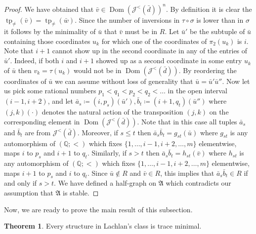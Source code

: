 \documentclass{amsart}
\theoremstyle{definition}
\newtheorem{theorem}{Theorem}[section]
\theoremstyle{remark}
\numberwithin{equation}{section}
\newcommand{\dom}{\operatorname{Dom}}
\newcommand{\typ}{\operatorname{tp}}
\newcommand\johnord[1]{\mathcal{J}^{<}(#1)}
\newcommand{\fa}{\mathfrak{A}}
\begin{document}
\begin{proof}
	We have obtained that $\bar{v}\in \dom(\johnord{\bar{d}})^n$. By definition it is clear the $\typ_{\neq}(\bar{v})=\typ_{\neq}(\bar{w})$. Since the number of inversions in $\tau\circ \sigma$ is lower than in $\sigma$ it follows by the minimality of $\bar{u}$ that $\bar{v}$ must be in $R$. Let $\bar{u}'$ be the subtuple of $\bar{u}$ containing those coordinates $u_k$ for which one of the coordinates of $\pi_2(u_k)$ is $i$. 
    Note that $i+1$ cannot show up in the second coordinate in any of the entries of $\bar{u}'$. Indeed, if both $i$ and $i+1$ showed up as a second coordinate in some entry $u_k$ of $\bar{u}$ then $v_k=\tau(u_k)$ would not be in $\dom(\johnord{\bar{d}})$. By reordering the coordinates of $\bar{u}$ we can assume without loss of generality that $\bar{u}=\bar{u}'\bar{u}''$. Now let us pick some rational numbers $p_1<q_1<p_2<q_2<\dots$ in the open interval $(i-1,i+2)$, and let $\bar{a}_s\coloneqq (i,p_s)(\bar{u}'), \bar{b}_t\coloneqq (i+1,q_t)(\bar{u}'')$ {where $(j,k)( \cdot )$ denotes the natural action of the transposition $(j,k)$ on the corresponding element in $\dom(\johnord{\bar{d}})$}. Note that in this case all tuples $\bar{a}_s$ and $\bar{b}_t$ are from $\johnord{\bar{d}}$. Moreover, if $s\leq t$ then $\bar{a}_s\bar{b}_t=g_{st}(\bar{u})$ where $g_{st}$ is any automorphism of $(\mathbb{Q};<)$ which fixes $\{1,\dots,i-1,i+2,\dots,m\}$ elementwise, maps $i$ to $p_s$ and $i+1$ to $q_t$. Similarly, if $s>t$ then $\bar{a}_s\bar{b}_t=h_{st}(\bar{v})$ where $h_{st}$ is any automorphism of $(\mathbb{Q};<)$ which fixes $\{1,\dots,i-1,i+2,\dots,m\}$ elementwise, maps $i+1$ to $p_s$ and $i$ to $q_t$. Since $\bar{u}\not\in R$ and $\bar{v}\in R$, this implies that $\bar{a}_s\bar{b}_t\in R$ if and only if $s>t$. We have defined a half-graph on $\fa$ which contradicts our assumption that $\fa$ is stable.
\end{proof}
	
	Now, we are ready to prove the main result of this subsection.

\begin{theorem}\label{trace_def}
	Every structure in Lachlan's class is trace minimal.
\end{theorem}
\end{document}
